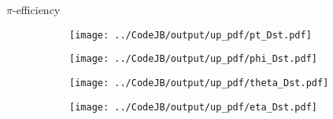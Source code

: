 \documentclass[11pt]{beamer}
\begin{document}
\begin{frame}{$\pi$-efficiency}
\begin{figure}
\begin{subfigure}{0.45\textwidth}
\texttt{[image: ../CodeJB/output/up\_pdf/pt\_Dst.pdf]}
\end{subfigure}
\begin{subfigure}{0.45\textwidth}
\texttt{[image: ../CodeJB/output/up\_pdf/phi\_Dst.pdf]}
\end{subfigure}
\begin{subfigure}{0.45\textwidth}
\texttt{[image: ../CodeJB/output/up\_pdf/theta\_Dst.pdf]}
\end{subfigure}
\begin{subfigure}{0.45\textwidth}
\texttt{[image: ../CodeJB/output/up\_pdf/eta\_Dst.pdf]}
\end{subfigure}
\end{figure}
\end{frame}
\end{document}
